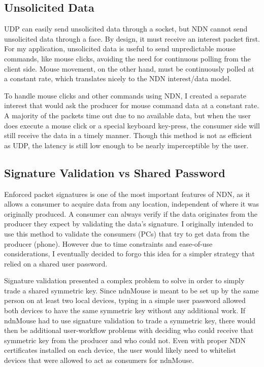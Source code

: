 \documentclass{sig-alternate}
\renewcommand\_{\textunderscore\allowbreak}  %
\begin{document}
\subsection{Unsolicited Data}
UDP can easily send unsolicited data through a socket, but NDN cannot send unsolicited data through a face. By design, it must receive an interest packet first. For my application, unsolicited data is useful to send unpredictable mouse commands, like mouse clicks, avoiding the need for continuous polling from the client side. Mouse movement, on the other hand, must be continuously polled at a constant rate, which translates nicely to the NDN interest/data model.

To handle mouse clicks and other commands using NDN, I created a separate interest that would ask the producer for mouse command data at a constant rate. A majority of the packets time out due to no available data, but when the user does execute a mouse click or a special keyboard key-press, the consumer side will still receive the data in a timely manner. Though this method is not as efficient as UDP, the latency is still low enough to be nearly imperceptible by the user.

\subsection{Signature Validation vs Shared Password}
Enforced packet signatures is one of the most important features of NDN, as it allows a consumer to acquire data from any location, independent of where it was originally produced. A consumer can always verify if the data originates from the producer they expect by validating the data's signature. I originally intended to use this method to validate the consumers (PCs) that try to get data from the producer (phone). However due to time constraints and ease-of-use considerations, I eventually decided to forgo this idea for a simpler strategy that relied on a shared user password.

Signature validation presented a complex problem to solve in order to simply trade a shared symmetric key. Since ndnMouse is meant to be set up by the same person on at least two local devices, typing in a simple user password allowed both devices to have the same symmetric key without any additional work. If ndnMouse had to use signature validation to trade a symmetric key, there would then be additional user-workflow problems with deciding who could receive that symmetric key from the producer and who could not. Even with proper NDN certificates installed on each device, the user would likely need to whitelist devices that were allowed to act as consumers for ndnMouse.
\end{document}
